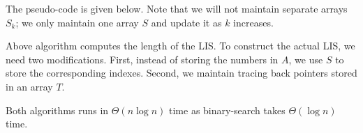 The pseudo-code is given below.  Note that we will not maintain separate arrays $S_k$; 
we only maintain one array $S$ and update it as $k$ increases.

\begin{algorithmblock}[0.8\textwidth]
	\xxx
	\xxx
	\xxx
	\xxx
	\xxx
	\xxx
\end{algorithmblock}

Above algorithm computes the length of the LIS. To construct the actual LIS, we need two modifications.
First, instead of storing the numbers in $A$, we use $S$ to store the corresponding indexes.
Second, we maintain tracing back pointers stored in an array $T$.

\begin{algorithmblock}[0.8\textwidth]
	\xxx
	\xxx
	\xxx
	\xxx
	\xxx
	\xxx
	\xxx
	\xxx
	\xxx
	\xxx
	\xxx
	\xxx
	\xxx
	\xxx
	\xxx
\end{algorithmblock}

Both algorithms runs in $\Theta(n\log n)$ time as binary-search takes $\Theta(\log n)$ time.
